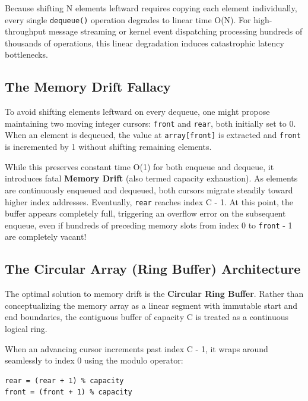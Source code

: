 \documentclass[10pt,journal,compsoc,onecolumn]{IEEEtran}
\begin{document}
Because shifting N elements leftward requires copying each element individually, every single \texttt{dequeue()} operation degrades to linear time O(N). For high-throughput message streaming or kernel event dispatching processing hundreds of thousands of operations, this linear degradation induces catastrophic latency bottlenecks.

\subsection{The Memory Drift Fallacy}

To avoid shifting elements leftward on every dequeue, one might propose maintaining two moving integer cursors: \texttt{front} and \texttt{rear}, both initially set to 0. When an element is dequeued, the value at \texttt{array[front]} is extracted and \texttt{front} is incremented by 1 without shifting remaining elements.

While this preserves constant time O(1) for both enqueue and dequeue, it introduces fatal \textbf{Memory Drift} (also termed capacity exhaustion). As elements are continuously enqueued and dequeued, both cursors migrate steadily toward higher index addresses. Eventually, \texttt{rear} reaches index C - 1. At this point, the buffer appears completely full, triggering an overflow error on the subsequent enqueue, even if hundreds of preceding memory slots from index 0 to \texttt{front} - 1 are completely vacant! 

\subsection{The Circular Array (Ring Buffer) Architecture}

The optimal solution to memory drift is the \textbf{Circular Ring Buffer}. Rather than conceptualizing the memory array as a linear segment with immutable start and end boundaries, the contiguous buffer of capacity C is treated as a continuous logical ring.

When an advancing cursor increments past index C - 1, it wraps around seamlessly to index 0 using the modulo operator:
\begin{verbatim}
rear = (rear + 1) % capacity
front = (front + 1) % capacity
\end{verbatim}
\end{document}
